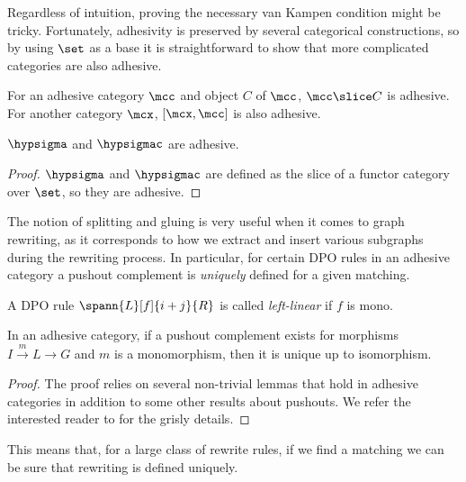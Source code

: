 Regardless of intuition, proving the necessary van Kampen condition might be
tricky.
Fortunately, adhesivity is preserved by several categorical constructions, so
by using \(\set\) as a base it is straightforward to show that more complicated
categories are also adhesive.

\begin{proposition}
    For an adhesive category \(\mcc\) and object \(C\) of \(\mcc\),
    \(\mcc \slice C\) is adhesive.
    For another category \(\mcx\), \([\mcx, \mcc]\) is also adhesive.
\end{proposition}

\begin{corollary}
    \(\hypsigma\) and \(\hypsigmac\) are adhesive.
\end{corollary}
\begin{proof}
    \(\hypsigma\) and \(\hypsigmac\) are defined as the slice of a functor
    category over \(\set\), so they are adhesive.
\end{proof}

The notion of splitting and gluing is very useful when it comes to graph
rewriting, as it corresponds to how we extract and insert various subgraphs
during the rewriting process.
In particular, for certain DPO rules in an adhesive category a pushout
complement is \emph{uniquely} defined for a given matching.

\begin{definition}
    A DPO rule \(\spann{L}[f]{i+j}{R}\) is called \emph{left-linear} if \(f\)
    is mono.
\end{definition}

\begin{theorem}
    In an adhesive category, if a pushout complement exists for morphisms
    \(I \xrightarrow{m} L \to G\) and \(m\) is a monomorphism, then it is unique
    up to isomorphism.
\end{theorem}
\begin{proof}
    The proof relies on several non-trivial lemmas that hold in adhesive
    categories in addition to some other results about pushouts.
    We refer the interested reader to
    \cite[Lems. 4.3.6 - 4.3.9]{kissinger2012pictures} for the grisly details.
\end{proof}

This means that, for a large class of rewrite rules, if we find a matching we
can be sure that rewriting is defined uniquely.

